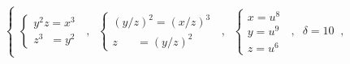 \begin{equation}\tag{2.25.2}
\left\{
\begin{array}{l}
\left\{\begin{array}{l} y^{2}z = x^{3} \\ z^{3} \;\; = y^{2} \end{array}\right. \;\;,\;\;
\left\{\begin{array}{l} (y/z)^{2} = (x/z)^{3} \\ z \;\;\;\;\;\; = (y/z)^{2} \end{array}\right. \;\;,\;\;
\left\{\begin{array}{l} x = u^{8} \\ y = u^{9} \\ z = u^{6} \end{array}\right. \;\;,\;\; \delta = 10 \;\;,
\end{array}
\right.
\end{equation}
\begin{center}
\end{center}
